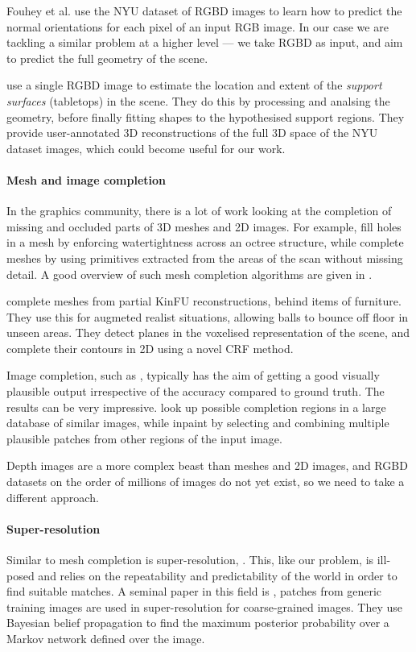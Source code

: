 \documentclass[10pt,twocolumn,letterpaper]{article}
\makeatletter
\newcommand*{\ea}{et al.\@\xspace}
\makeatother
\begin{document}
Fouhey \ea \cite{fouhey-iccv-2013} use the NYU dataset of RGBD images to learn how to predict the normal orientations for each pixel of an input RGB image. 
In our case we are tackling a similar problem at a higher level --- we take RGBD as input, and aim to predict the full geometry of the scene.

\cite{guo-iccv-2013} use a single RGBD image to estimate the location and extent of the \emph{support surfaces} (\eg tabletops) in the scene. They do this by processing and analsing the geometry, before finally fitting shapes to the hypothesised support regions. They provide user-annotated 3D reconstructions of the full 3D space of the NYU dataset images, which could become useful for our work.


\paragraph{Mesh and image completion}
In the graphics community, there is a lot of work looking at the completion of missing and occluded parts of 3D meshes and 2D images. 
For example, \cite{podolak-esgp-2005} fill holes in a mesh by enforcing watertightness across an octree structure, while \cite{schnabel-eurographics-2009} complete meshes by using primitives extracted from the areas of the scan without missing detail. 
A good overview of such mesh completion algorithms are given in \cite{ju-cst-2009}.

\cite{silberman-eccv-2014} complete meshes from partial KinFU reconstructions, \eg behind items of furniture.
They use this for augmeted realist situations, \eg allowing balls to bounce off floor in unseen areas.
They detect planes in the voxelised representation of the scene, and complete their contours in 2D using a novel CRF method.

Image completion, such as \cite{hays-siggraph-2007, criminisi-cvpr-2003}, typically has the aim of getting a good visually plausible output irrespective of the accuracy compared to ground truth. 
The results can be very impressive. 
\cite{hays-siggraph-2007} look up possible completion regions in a large database of similar images, while \cite{criminisi-cvpr-2003} inpaint by selecting and combining multiple plausible patches from other regions of the input image.

Depth images are a more complex beast than meshes and 2D images, and RGBD datasets on the order of millions of images do not yet exist, so we need to take a different approach.

\paragraph{Super-resolution}
Similar to mesh completion is super-resolution, \eg \cite{macaodha-eccv-2012}. 
This, like our problem, is ill-posed and relies on the repeatability and predictability of the world in order to find suitable matches.
A seminal paper in this field is \cite{freeman-ijcv-2000}, patches from generic training images are used in super-resolution for coarse-grained images. They use Bayesian belief propagation to find the maximum posterior probability over a Markov network defined over the image.
\end{document}
